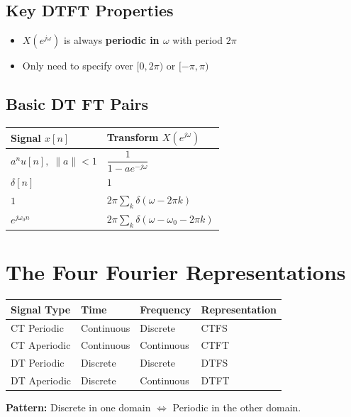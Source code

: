 \documentclass[11pt]{article}
\begin{document}
\subsection*{Key DTFT Properties}
\begin{itemize}
  \item $X(e^{j\omega})$ is always \textbf{periodic in $\omega$} with period $2\pi$
  \item Only need to specify over $[0, 2\pi)$ or $[-\pi, \pi)$
\end{itemize}

\subsection*{Basic DT FT Pairs}

\begin{center}
\begin{tabular}{|l|l|}
\hline
\textbf{Signal $x[n]$} & \textbf{Transform $X(e^{j\omega})$} \\
\hline
$a^n u[n], \; \|a\| < 1$ & $\dfrac{1}{1 - ae^{-j\omega}}$ \\
\hline
$\delta[n]$ & $1$ \\
\hline
$1$ & $2\pi \sum_k \delta(\omega - 2\pi k)$ \\
\hline
$e^{j\omega_0 n}$ & $2\pi \sum_k \delta(\omega - \omega_0 - 2\pi k)$ \\
\hline
\end{tabular}
\end{center}

\section*{The Four Fourier Representations}

\begin{center}
\begin{tabular}{|l|l|l|l|}
\hline
\textbf{Signal Type} & \textbf{Time} & \textbf{Frequency} & \textbf{Representation} \\
\hline
CT Periodic & Continuous & Discrete & CTFS \\
\hline
CT Aperiodic & Continuous & Continuous & CTFT \\
\hline
DT Periodic & Discrete & Discrete & DTFS \\
\hline
DT Aperiodic & Discrete & Continuous & DTFT \\
\hline
\end{tabular}
\end{center}

\textbf{Pattern:} Discrete in one domain $\Leftrightarrow$ Periodic in the other domain.
\end{document}
